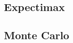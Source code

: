 
\subsection{Expectimax} %
\label{sub:expectimax}


\subsection{Monte Carlo} %
\label{sub:monte_carlo}




